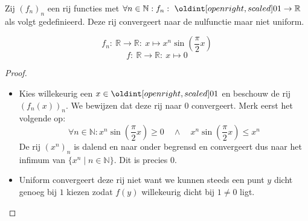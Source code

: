 \documentclass[main.tex]{subfiles}
\begin{document}
\begin{vb}
  Zij $(f_{n})_{n}$ een rij functies met $\forall n\in\mathbb{N}: f_{n}:\ \interval[open right]{0}{1}\rightarrow \mathbb{R}$ als volgt gedefinieerd.
  Deze rij convergeert naar de nulfunctie maar niet uniform.

  \noindent
  \begin{minipage}{.45\textwidth}
    \begin{figure}[H]
      \centering
    \end{figure}
  \end{minipage}
  \begin{minipage}{.45\textwidth}
    \[ f_{n}:\ \mathbb{R} \rightarrow \mathbb{R}:\ x \mapsto x^{n}\sin\left(\frac{\pi}{2}x\right) \]
    \[ f:\ \mathbb{R} \rightarrow \mathbb{R}:\ x \mapsto 0 \]
  \end{minipage}
  
  \begin{proof}
    \noindent
    \begin{itemize}
    \item 
      Kies willekeurig een $x\in\interval[open right]{0}{1}$ en beschouw de rij $(f_{n}(x))_{n}$.
      We bewijzen dat deze rij naar $0$ convergeert.
      Merk eerst het volgende op:
      \[ \forall n\in \mathbb{N}: x^{n}\sin\left(\frac{\pi}{2}x\right) \ge 0 \quad\wedge\quad x^{n}\sin\left(\frac{\pi}{2}x\right) \le x^{n} \]
      De rij $(x^{n})_{n}$ is dalend en naar onder begrensd en convergeert dus naar het infimum van $\{x^{n}\mid n\in\mathbb{N}\}$.
      Dit is precies $0$.
    \item 
      Uniform convergeert deze rij niet want we kunnen steeds een punt $y$ dicht genoeg bij $1$ kiezen zodat $f(y)$ willekeurig dicht bij $1 \neq 0$ ligt.
    \end{itemize}
  \end{proof}
\end{vb}
\end{document}
